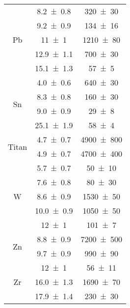 \begin{table}[H]
\begin{tabular}{c|c|c}
\multirow{5}{*}{Pb} & \num{8.2\pm 0.8} & \num{320\pm 30} \\ & \num{9.2\pm 0.9} & \num{134\pm 16} \\ & \num{11\pm 1} & \num{1210\pm 80} \\ & \num{12.9\pm 1.1} & \num{700\pm 30} \\ & \num{15.1\pm 1.3} & \num{57\pm 5} \\\hline
\multirow{4}{*}{Sn} & \num{4.0\pm 0.6} & \num{640\pm 30} \\ & \num{8.3\pm 0.8} & \num{160\pm 30} \\ & \num{9.0\pm 0.9} & \num{29\pm 8} \\ & \num{25.1\pm 1.9} & \num{58\pm 4} \\\hline
\multirow{2}{*}{Titan} & \num{4.7\pm 0.7} & \num{4900\pm 800} \\ & \num{4.9\pm 0.7} & \num{4700\pm 400} \\\hline
\multirow{5}{*}{W} & \num{5.7\pm 0.7} & \num{50\pm 10} \\ & \num{7.6\pm 0.8} & \num{80\pm 30} \\ & \num{8.6\pm 0.9} & \num{1530\pm 50} \\ & \num{10.0\pm 0.9} & \num{1050\pm 50} \\ & \num{12\pm 1} & \num{101\pm 7} \\\hline
\multirow{2}{*}{Zn} & \num{8.8\pm 0.9} & \num{7200\pm 500} \\ & \num{9.7\pm 0.9} & \num{990\pm 90} \\\hline
\multirow{3}{*}{Zr} & \num{12\pm 1} & \num{56\pm 11} \\ & \num{16.0\pm 1.3} & \num{1690\pm 70} \\ & \num{17.9\pm 1.4} & \num{230\pm 30} \\\hline

    \end{tabular}
\end{table}